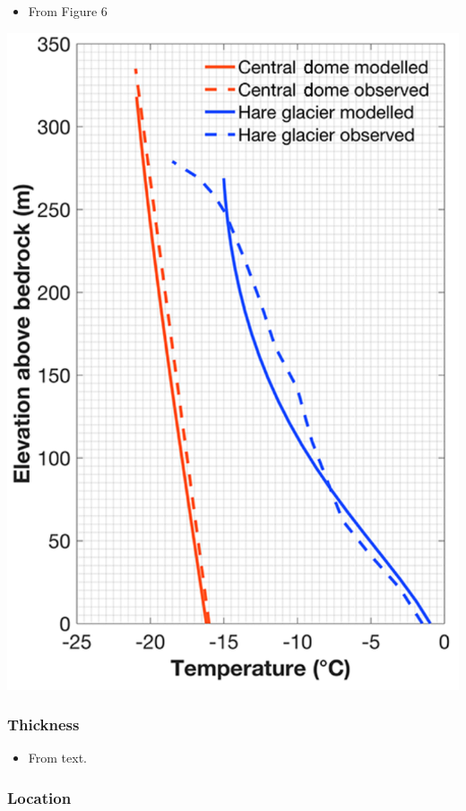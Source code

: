 \documentclass[article,a4paper,times,11pt,twoside]{article}
\begin{document}
\begin{itemize}
\item From \textcite{zekollari_2017} Figure 6
\end{itemize}
\begin{center}
\includegraphics[width=.9\linewidth]{hanstausen_dome/zekollari_2017_fig6.png}
\end{center}

\subsubsection{Thickness}
\label{sec:orgbb1f25a}

\begin{itemize}
\item From \textcite{zekollari_2017} text.
\end{itemize}

\subsubsection{Location}
\label{sec:org92d0494}
\end{document}
